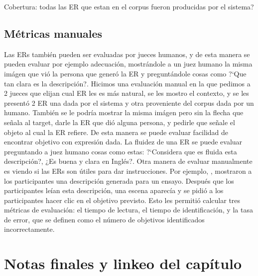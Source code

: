 Cobertura: todas las ER que estan en el corpus fueron producidas por el sistema?







\subsection{M\'etricas manuales}

Las ERs tambi\'en pueden ser evaluadas por jueces humanos, y de esta manera se pueden evaluar por ejemplo adecuaci\'on, mostr\'andole a un juez humano la misma im\'agen que vi\'o la persona que gener\'o la ER y pregunt\'andole cosas como ?`Que tan clara es la descripci\'on?.
Hicimos una evaluaci\'on manual en la que pedimos a 2 jueces que elijan cual ER les es m\'as natural, se les mostro el contexto, y se les present\'o 2 ER una dada por el sistema y otra proveniente del corpus dada por un humano. Tambi\'en se le podr\'ia mostrar la misma im\'agen pero sin la flecha que se\~nala al target, darle la ER que di\'o alguna persona, y pedirle que se\~nale el objeto al cual la ER refiere. De esta manera se puede evaluar facilidad de encontrar objetivo con expresi\'on dada.
La fluidez de una ER se puede evaluar preguntando a juez humano cosas como estas: 
?`Considera que es fluida esta descripci\'on?, ¿Es buena y clara en Ingl\'es?. 
Otra manera de evaluar manualmente es viendo si las ERs son \'utiles para dar instrucciones. Por ejemplo, \cite{BelzGattEvaluation}, mostraron a los participantes una descripci\'on generada para un ensayo. Despu\'es que los participantes le\'ian esta descripci\'on, una escena aparec\'ia y se pidi\'o a los participantes
hacer clic en el objetivo previsto. Esto les permiti\'o calcular tres m\'etricas de evaluaci\'on: %
el tiempo de lectura, el tiempo de identificaci\'on, y la tasa de error, que se definen como el n\'umero de objetivos identificados incorrectamente.


\section{Notas finales y linkeo del cap\'itulo}
\label{sec:linkeo2}

